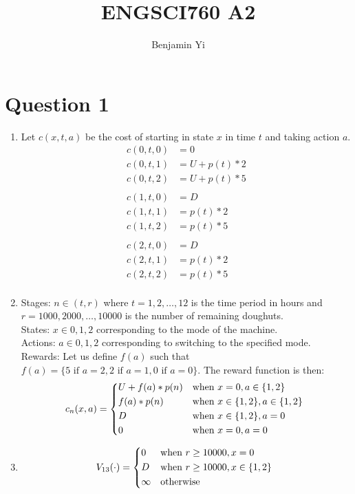 \documentclass[10pt,a4paper]{article}
\begin{document}
\title{ENGSCI760 A2}
\author{Benjamin Yi}
	
\section*{Question 1}
\begin{enumerate}
	\item Let \(c(x,t,a)\) be the cost of starting in state \(x\) in time \(t\) and taking action \(a\). \\
	\begin{align*}
	c(0,t,0) &= 0 \\
	c(0,t,1) &= U + p(t)*2 \\
	c(0,t,2) &= U + p(t)*5 \\ \\
	c(1,t,0) &= D \\
	c(1,t,1) &= p(t)*2 \\
	c(1,t,2) &= p(t)*5 \\ \\
	c(2,t,0) &= D \\
	c(2,t,1) &= p(t)*2 \\
	c(2,t,2) &= p(t)*5 \\
	\end{align*}
	
	\item Stages: \(n \in (t, r)\) where \(t = 1, 2, \dots, 12\) is the time period in hours and \(r = 1000, 2000, \dots, 10000\) is the number of remaining doughuts. \\
	States: \(x \in {0, 1, 2}\) corresponding to the mode of the machine. \\
	Actions: \(a \in {0, 1, 2}\) corresponding to switching to the specified mode.\\
	Rewards: Let us define \(f(a)\) such that \(f(a) = \{5 \text{ if } a=2, 2 \text{ if } a=1, 0 \text{ if } a=0\}\). The reward function is then: \\
	\[
	c_n(x,a) = \begin{dcases*}
	U + f(a)*p(n)  & when $x=0, a \in \{1, 2\}$ \\
	f(a)*p(n) & when $x \in \{1, 2\}, a \in \{1, 2\}$ \\
	D & when $ x \in \{1, 2\}, a=0$ \\
	0 & when $ x=0, a=0$ \\
	\end{dcases*}
	\]
	
	\item
	\[
	V_{13}(\cdot) = \begin{dcases*}
	0 & when $r \geq 10000, x=0$ \\
	D & when $r \geq 10000, x \in \{1, 2\}$ \\
	\infty & otherwise\\
	\end{dcases*}
	\]
	

\end{enumerate}
\end{document}
